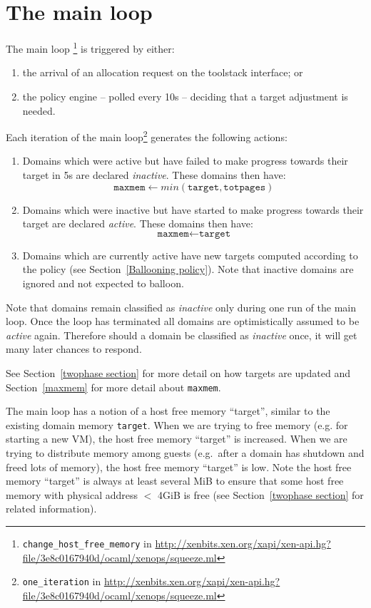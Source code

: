 \documentclass{article}
\begin{document}
\section{The main loop}
\label{The main loop}

The main loop \footnote{\texttt{change\_host\_free\_memory} in \url{http://xenbits.xen.org/xapi/xen-api.hg?file/3e8c0167940d/ocaml/xenops/squeeze.ml}}  is triggered by either:
\begin{enumerate}
\item the arrival of an allocation request on the toolstack interface; or
\item the policy engine -- polled every 10s -- deciding that a target adjustment is needed.
\end{enumerate}
Each iteration of the main loop\footnote{\texttt{one\_iteration} in \url{http://xenbits.xen.org/xapi/xen-api.hg?file/3e8c0167940d/ocaml/xenops/squeeze.ml}} generates the following actions:
\begin{enumerate}
\item Domains which were active but have failed to make progress towards their target in 5s are declared {\em inactive}. These domains then have:
\[
\texttt{maxmem}\leftarrow\mathit{min}(\texttt{target}, \texttt{totpages})
\]
\item Domains which were inactive but have started to make progress towards their target are declared {\em active}. These domains then have:
\[
\texttt{maxmem}\leftarrow\texttt{target}
\]
\item Domains which are currently active have new targets computed according to the policy (see Section~\ref{Ballooning policy}). Note that inactive domains are ignored and not expected to balloon.
\end{enumerate}
Note that domains remain classified as {\em inactive} only during one run of the main loop. Once the loop has terminated all domains are optimistically assumed to be {\em active} again. Therefore should a domain be classified as {\em inactive} once, it will get many later chances to respond.

See Section~\ref{twophase section} for more detail on how targets are updated and Section~\ref{maxmem} for more detail about \texttt{maxmem}.

The main loop has a notion of a host free memory ``target'', similar to the existing domain memory \texttt{target}. When we are trying to free memory (e.g. for starting a new VM), the host free memory ``target'' is increased. When we are trying to distribute memory among guests (e.g.\ after a domain has shutdown and freed lots of memory), the host free memory ``target'' is low. Note the host free memory ``target'' is always at least several MiB to ensure that some host free memory  with physical address $<$ 4GiB is free (see Section~\ref{twophase section} for related information).
\end{document}
